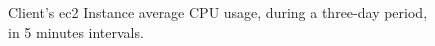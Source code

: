 \begin{figure}[!htbp]
    \centering
    \caption[Client CPU Usage Example]{Client's \gls{ec2} Instance average CPU usage, during a three-day period, in 5 minutes intervals.}
    \label{fig:caesb-cpu-usage}
\end{figure}
    